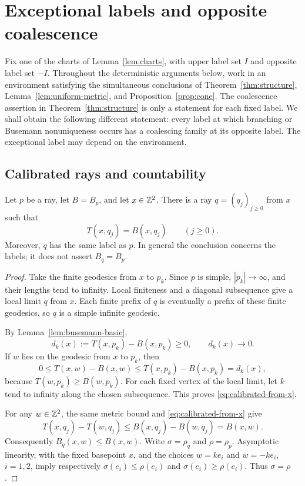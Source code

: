 \section{Exceptional labels and opposite coalescence}
\label{sec:exceptional}

Fix one of the charts of Lemma~\ref{lem:charts}, with upper label
set $I$ and opposite label set $-I$.  Throughout the deterministic
arguments below, work in an environment satisfying the simultaneous
conclusions of Theorem~\ref{thm:structure}, Lemma~\ref{lem:uniform-metric},
and Proposition~\ref{prop:cone}.  The coalescence assertion in
Theorem~\ref{thm:structure} is only a statement for each fixed label.
We shall obtain the following different statement: every label at which
branching or Busemann nonuniqueness occurs has a coalescing family at its
opposite label.  The exceptional label may depend on the environment.

\subsection{Calibrated rays and countability}

\begin{lemma}
\label{lem:calibrated-rays}
Let $p$ be a ray, let $B=B_p$, and let $x\in\mathbb Z^2$.  There is a ray
$q=(q_j)_{j\ge0}$ from $x$ such that
\begin{equation}
  T(x,q_j)=B(x,q_j)\qquad(j\ge0).
  \label{eq:calibrated-from-x}
\end{equation}
Moreover, $q$ has the same label as $p$.  In general the conclusion
concerns the labels; it does not assert $B_q=B_p$.
\end{lemma}

\begin{proof}
Take the finite geodesics from $x$ to $p_k$.  Since $p$ is simple,
$|p_k|\to\infty$, and their lengths tend to infinity.  Local finiteness
and a diagonal subsequence give a local limit $q$ from $x$.  Each finite
prefix of $q$ is eventually a prefix of these finite geodesics, so $q$
is a simple infinite geodesic.

By Lemma~\ref{lem:busemann-basic},
\begin{equation}
 d_k(x):=T(x,p_k)-B(x,p_k)\ge0,
 \qquad d_k(x)\longrightarrow0.
 \label{eq:calibrated-limit-defect}
\end{equation}
If $w$ lies on the geodesic from $x$ to $p_k$, then
\[
 0\le T(x,w)-B(x,w)
 \le T(x,p_k)-B(x,p_k)=d_k(x),
\]
because $T(w,p_k)\ge B(w,p_k)$.  For each fixed vertex of the local
limit, let $k$ tend to infinity along the chosen subsequence.  This
proves \eqref{eq:calibrated-from-x}.

For any $w\in\mathbb Z^2$, the same metric bound and
\eqref{eq:calibrated-from-x} give
\[
 T(x,q_j)-T(w,q_j)
 \le B(x,q_j)-B(w,q_j)=B(x,w).
\]
Consequently $B_q(x,w)\le B(x,w)$.  Write $\sigma=\rho_q$ and
$\rho=\rho_p$.  Asymptotic linearity, with the fixed basepoint $x$,
and the choices $w=ke_i$ and $w=-ke_i$, $i=1,2$, imply respectively
$\sigma(e_i)\le\rho(e_i)$ and $\sigma(e_i)\ge\rho(e_i)$.
Thus $\sigma=\rho$.
\end{proof}

